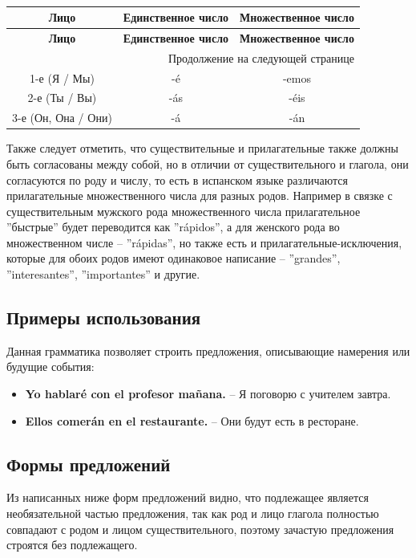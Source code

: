 \documentclass[a4paper,final]{article}
\begin{document}
\begin{longtable}{|c|c|c|}
\caption{} \\
\hline
\textbf{Лицо} & \textbf{Единственное число} & \textbf{Множественное число} \\ \hline
\endfirsthead
\hline
\textbf{Лицо} & \textbf{Единственное число} & \textbf{Множественное число} \\ \hline
\endhead

\hline \multicolumn{3}{r}{{Продолжение на следующей странице}} \\
\endfoot

\hline
\endlastfoot

1-е (Я / Мы) & -é & -emos \\\hline
2-е (Ты / Вы) & -ás & -éis \\\hline
3-е (Он, Она / Они) & -á & -án \\\hline
\end{longtable}

Также следует отметить, что существительные и прилагательные также должны быть согласованы между собой, но в отличии от существительного и глагола, они согласуются по роду и числу, то есть в испанском языке различаются прилагательные множественного числа для разных родов. Например в связке с существительным мужского рода множественного числа прилагательное ''быстрые'' будет переводится как ''rápidos'', а для женского рода во множественном числе -- ''rápidas'', но также есть и прилагательные-исключения, которые для обоих родов имеют одинаковое написание -- ''grandes'', ''interesantes'', ''importantes'' и другие.

\subsection{Примеры использования}
Данная грамматика позволяет строить предложения, описывающие намерения или будущие события:
\begin{itemize}
    \item \textbf{Yo hablaré con el profesor mañana.} -- Я поговорю с учителем завтра.
    \item \textbf{Ellos comerán en el restaurante.} -- Они будут есть в ресторане.
\end{itemize}

\subsection{Формы предложений}
Из написанных ниже форм предложений видно, что подлежащее является необязательной частью предложения, так как род и лицо глагола полностью совпадают с родом и лицом существительного, поэтому зачастую предложения строятся без подлежащего.
\end{document}
